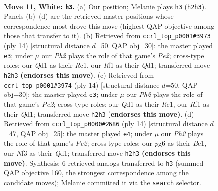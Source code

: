 \documentclass[11pt]{article}
\begin{document}
\clearpage

\begin{figure}[p]\centering
\begin{subfigure}{0.46\textwidth}\centering
\resizebox{\linewidth}{!}{%
\newchessgame
\chessboard[
  setfen={rnbqkb1r/5p2/pp2pnp1/7p/P2P4/1BN2N2/1P3PPP/R1BQ1RK1 w kq - 0 11},
  showmover=false,
  pgfstyle=straightmove, color=movearrow, markmove={h2-h3}
]}
\caption{}
\end{subfigure}\hfill
\begin{subfigure}{0.46\textwidth}\centering
\resizebox{\linewidth}{!}{%
\newchessgame
\chessboard[
  setfen={r1bqkb1r/1p3ppp/p1n1pn2/3p4/3P1B2/2N2N2/PP2PPPP/2RQKB1R w Kkq - 0 8},
  showmover=false,
  pgfstyle=straightmove, color=movearrow, markmove={e2-e3}
]}
\caption{}
\end{subfigure}
\\[4pt]
\begin{subfigure}{0.46\textwidth}\centering
\resizebox{\linewidth}{!}{%
\newchessgame
\chessboard[
  setfen={r1bqkb1r/1p3ppp/p1n1pn2/3p4/3P1B2/2N2N2/PP2PPPP/2RQKB1R w Kkq - 0 8},
  showmover=false,
  pgfstyle=straightmove, color=movearrow, markmove={e2-e3}
]}
\caption{}
\end{subfigure}\hfill
\begin{subfigure}{0.46\textwidth}\centering
\resizebox{\linewidth}{!}{%
\newchessgame
\chessboard[
  setfen={rnbqkb1r/1p3p1p/p2p1np1/2pP4/8/2N2N1P/PP2PPP1/R1BQKB1R w KQkq - 0 8},
  showmover=false,
  pgfstyle=straightmove, color=movearrow, markmove={e2-e4}
]}
\caption{}
\end{subfigure}
\caption{\textbf{Move 11, White: \texttt{h3}.} (a) Our position; Melanie plays \texttt{h3} (\texttt{h2h3}). Panels (b)--(d) are the retrieved master positions whose correspondence most drove this move (highest QAP objective among those that transfer to it). (b) Retrieved from \texttt{ccrl\_top\_p0001\#3973} (ply 14) [structural distance $d$=50, QAP obj=30]: the master played \texttt{e3}; under $\mu$ our \emph{Ph2} plays the role of that game's \emph{Pe2}; cross-type roles: our \emph{Q}d1 as their \emph{R}c1, our \emph{R}f1 as their \emph{Q}d1; transferred move \texttt{h2h3} \textbf{(endorses this move)}. (c) Retrieved from \texttt{ccrl\_top\_p0001\#3974} (ply 14) [structural distance $d$=50, QAP obj=30]: the master played \texttt{e3}; under $\mu$ our \emph{Ph2} plays the role of that game's \emph{Pe2}; cross-type roles: our \emph{Q}d1 as their \emph{R}c1, our \emph{R}f1 as their \emph{Q}d1; transferred move \texttt{h2h3} \textbf{(endorses this move)}. (d) Retrieved from \texttt{ccrl\_top\_p0000\#2686} (ply 14) [structural distance $d$=47, QAP obj=25]: the master played \texttt{e4}; under $\mu$ our \emph{Ph2} plays the role of that game's \emph{Pe2}; cross-type roles: our \emph{p}g6 as their \emph{B}c1, our \emph{N}f3 as their \emph{Q}d1; transferred move \texttt{h2h3} \textbf{(endorses this move)}. Synthesis: 6 retrieved analogs transferred to \texttt{h3} (summed QAP objective 160, the strongest correspondence among the candidate moves); Melanie committed it via the \texttt{search} selector.}
\label{fig:thought-m20}
\end{figure}
\end{document}
